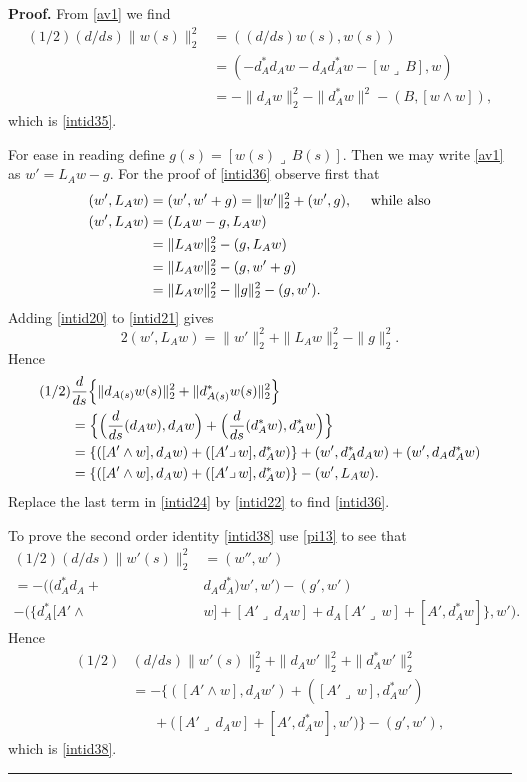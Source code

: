 \documentclass[12pt]{article}
\newenvironment{proof}[1][Proof]{\textbf{#1.} }{\ \rule{0.5em}{0.5em}}
\def \beq{\begin{equation}}
\def \eeq{\end{equation}}
\def \eref{\eqref}
\def \lrc{\lrcorner\,}
\numberwithin{equation}{section}
\begin{document}
                    \begin{proof} 
  From \eref{av1} we find
  \begin{align*}
  (1/2) (d/ds) \| w(s) \|_2^2 
  & = ( (d/ds) w(s),  w(s))\\
  & = (  -d_A^* d_A w - d_Ad_A^*w - [w\lrc B],  w)\\
   & = - \| d_A w\|_2^2 - \| d_A^* w\|^2  -( B, [w\wedge w]),
   \end{align*}
   which is \eref{intid35}.  
   
   
   For ease in reading define $g(s) = [w(s)\lrc B(s)]$. Then we may write
                    \eref{av1} as   $w' =L_A w -g$.   
   For the proof of \eref{intid36} observe first that 
 \begin{align}
   (w', L_A w)   &= (w', w' + g) = \| w'\|_2^2 + (w', g),\ \ \ \  \text{while also}  \label{intid20}\\   
   (w', L_A w) &= ( L_A w - g, L_A w) \notag\\
    &= \| L_A w\|_2^2 - (g, L_A w)\notag\\
    &= \| L_A w\|_2^2 - (g, w' +g)\notag \\
    &=  \| L_A w\|_2^2 - \| g\|_2^2 - (g,w').   \label{intid21}
    \end{align}
 Adding \eref{intid20} to \eref{intid21} gives
 \beq
 2(w', L_Aw) =   \| w'\|_2^2 +  \| L_A w\|_2^2   - \| g\|_2^2.     \label{intid22}
 \eeq     
    Hence
 \begin{align}
(1/2)& \frac{d}{ds}\Big\{ \| d_{A(s)} w(s) \|_2^2 + \| d_{A(s)}^* w(s) \|_2^2\Big\}  \notag\\
&= \Big\{\Big(\frac{d}{ds} (d_A w), d_Aw\Big)+ \Big(\frac{d}{ds}(d_A^* w), d_A^* w\Big)\Big\} \notag\\
&=\{([A' \wedge w], d_A w) + ([A'\lrc w], d_A^*w)\} +(w' ,d_A^* d_Aw)  + (w', d_A d_A^* w)\notag\\
&=\{([A' \wedge w], d_A w) + ([A'\lrc w], d_A^*w)\} - (w', L_A w).     \label{intid24}
\end{align}    
Replace the last term in \eref{intid24} by \eref{intid22} to find \eref{intid36}.
    
To prove the second order identity \eref{intid38}  use \eref{pi13}  to see that
\begin{align*}
(1/2)(d/ds) \| w'(s)\|_2^2 &= (w'', w') \\
= -\Big( (d_A^* d_A + &d_Ad_A^*) w', w'\Big) -(g',w')  \\
             - \Big( \Big\{d_A^* [A' \wedge &w] + [A' \lrc d_Aw] 
                         + d_A [A' \lrc w] + [A', d_A^* w] \Big\}, w'\Big).
\end{align*}
Hence
\begin{align*}
(1/2)&(d/ds) \| w'(s)\|_2^2 + \| d_A w'\|_2^2 + \| d_A^* w'\|_2^2 \\
&=-\Big\{ ( [A' \wedge w], d_A w') + ([A'\lrc w], d_A^* w')  \\
 &\ \ \ \ \ \ \         +\Big( [A' \lrc d_Aw] + [A', d_A^* w], w'\Big)\Big\} - (g',w'),
 \end{align*}
 which is \eref{intid38}.
\end{proof}
\end{document}
